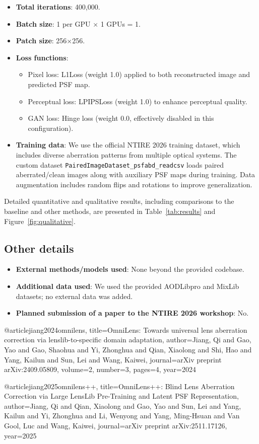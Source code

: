 \documentclass[10pt,twocolumn,letterpaper]{article}
\begin{document}
\begin{itemize}
\begin{itemize}
            \item \textbf{Total iterations}: 400,000.
            \item \textbf{Batch size}: 1 per GPU × 1 GPUs = 1.
            \item \textbf{Patch size}: 256×256.
            \item \textbf{Loss functions}:
                \begin{itemize}
                    \item Pixel loss: L1Loss (weight 1.0) applied to both reconstructed image and predicted PSF map.
                    \item Perceptual loss: LPIPSLoss (weight 1.0) to enhance perceptual quality.
                    \item GAN loss: Hinge loss (weight 0.0, effectively disabled in this configuration).
                \end{itemize}
            \item \textbf{Training data}: We use the official NTIRE 2026 training dataset, which includes diverse aberration patterns from multiple optical systems. The custom dataset \texttt{PairedImageDataset\_psfabd\_readcsv} loads paired aberrated/clean images along with auxiliary PSF maps during training. Data augmentation includes random flips and rotations to improve generalization.
        \end{itemize}
    Detailed quantitative and qualitative results, including comparisons to the baseline and other methods, are presented in Table~\ref{tab:results} and Figure~\ref{fig:qualitative}.
\end{itemize}

\subsection{Other details}
\begin{itemize}
    \item \textbf{External methods/models used}: None beyond the provided codebase.
    \item \textbf{Additional data used}: We used the provided AODLibpro and MixLib datasets; no external data was added.
    \item \textbf{Planned submission of a paper to the NTIRE 2026 workshop}:  No.
\end{itemize}


{\small


@article{jiang2024omnilens,
  title={OmniLens: Towards universal lens aberration correction via lenslib-to-specific domain adaptation},
  author={Jiang, Qi and Gao, Yao and Gao, Shaohua and Yi, Zhonghua and Qian, Xiaolong and Shi, Hao and Yang, Kailun and Sun, Lei and Wang, Kaiwei},
  journal={arXiv preprint arXiv:2409.05809},
  volume={2},
  number={3},
  pages={4},
  year={2024}
}

@article{jiang2025omnilens++,
  title={OmniLens++: Blind Lens Aberration Correction via Large LensLib Pre-Training and Latent PSF Representation},
  author={Jiang, Qi and Qian, Xiaolong and Gao, Yao and Sun, Lei and Yang, Kailun and Yi, Zhonghua and Li, Wenyong and Yang, Ming-Hsuan and Van Gool, Luc and Wang, Kaiwei},
  journal={arXiv preprint arXiv:2511.17126},
  year={2025}
}}
\end{document}
